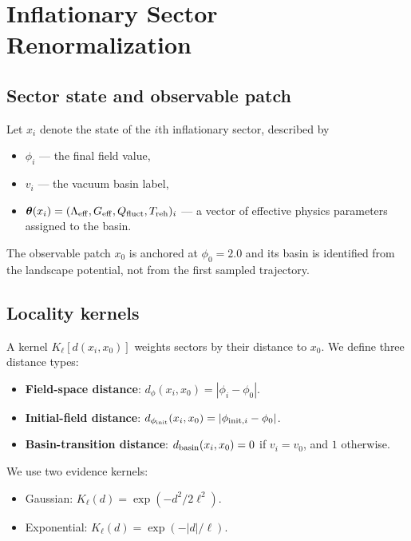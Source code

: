 \section{Inflationary Sector Renormalization}
\label{sec:framework}

\subsection{Sector state and observable patch}

Let $x_i$ denote the state of the $i$th inflationary sector, described by
\begin{itemize}
  \item $\phi_i$ --- the final field value,
  \item $v_i$ --- the vacuum basin label,
  \item $\boldsymbol{\theta}(x_i) = (\Lambda_{\rm eff}, G_{\rm eff}, Q_{\rm fluct}, T_{\rm reh})_i$
        --- a vector of effective physics parameters assigned to the basin.
\end{itemize}
The observable patch $x_0$ is anchored at $\phi_0 = 2.0$ and its basin is
identified from the landscape potential, not from the first sampled trajectory.

\subsection{Locality kernels}

A kernel $K_\ell[d(x_i, x_0)]$ weights sectors by their distance to $x_0$.
We define three distance types:

\begin{itemize}
  \item \textbf{Field-space distance}: $d_\phi(x_i, x_0) = |\phi_i - \phi_0|$.
  \item \textbf{Initial-field distance}: $d_{\phi_{\rm init}}(x_i, x_0) = |\phi_{{\rm init},i} - \phi_0|$.
  \item \textbf{Basin-transition distance}: $d_{\rm basin}(x_i, x_0) = 0$ if
        $v_i = v_0$, and $1$ otherwise.
\end{itemize}

We use two evidence kernels:

\begin{itemize}
  \item Gaussian: $K_\ell(d) = \exp(-d^2 / 2\ell^2)$.
  \item Exponential: $K_\ell(d) = \exp(-|d| / \ell)$.
\end{itemize}

